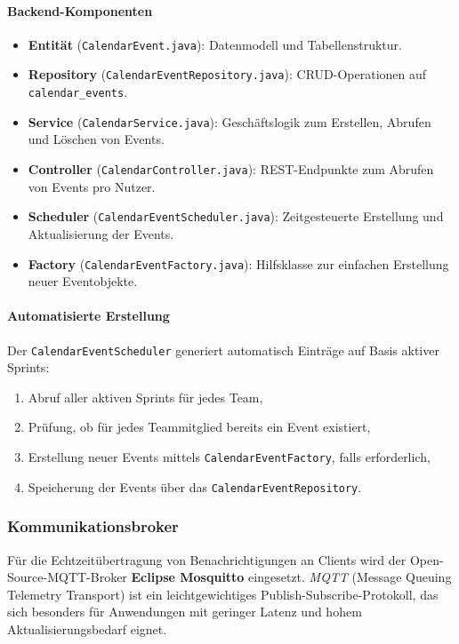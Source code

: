 \documentclass[12pt,a4paper]{report}
\begin{document}
\paragraph{Backend-Komponenten}
    \begin{itemize}
        \item \textbf{Entität} (\texttt{CalendarEvent.java}): Datenmodell und Tabellenstruktur.
        \item \textbf{Repository} (\texttt{CalendarEventRepository.java}): CRUD-Operationen auf \texttt{calendar\_events}.
        \item \textbf{Service} (\texttt{CalendarService.java}): Geschäftslogik zum Erstellen, Abrufen und Löschen von Events.
        \item \textbf{Controller} (\texttt{CalendarController.java}): REST-Endpunkte zum Abrufen von Events pro Nutzer.
        \item \textbf{Scheduler} (\texttt{CalendarEventScheduler.java}): Zeitgesteuerte Erstellung und Aktualisierung der Events.
        \item \textbf{Factory} (\texttt{CalendarEventFactory.java}): Hilfsklasse zur einfachen Erstellung neuer Eventobjekte.
    \end{itemize}

\paragraph{Automatisierte Erstellung}
    Der \texttt{CalendarEventScheduler} generiert automatisch Einträge auf Basis aktiver Sprints:
    \begin{enumerate}
        \item Abruf aller aktiven Sprints für jedes Team,
        \item Prüfung, ob für jedes Teammitglied bereits ein Event existiert,
        \item Erstellung neuer Events mittels \texttt{CalendarEventFactory}, falls erforderlich,
        \item Speicherung der Events über das \texttt{CalendarEventRepository}.
    \end{enumerate}

\subsubsection{Kommunikationsbroker}
    Für die Echtzeitübertragung von Benachrichtigungen an Clients wird der Open-Source-MQTT-Broker \textbf{Eclipse Mosquitto} eingesetzt.
    \textit{MQTT} (Message Queuing Telemetry Transport) ist ein leichtgewichtiges Publish-Subscribe-Protokoll, das sich besonders für Anwendungen mit geringer Latenz und hohem Aktualisierungsbedarf eignet.
\end{document}
